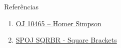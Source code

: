 \begin{frame}[fragile]{Referências}

    \begin{enumerate}
        \item \href{http://uva.onlinejudge.org/index.php?option=com_onlinejudge&Itemid=8&category=24&page=show_problem&problem=1406}{OJ 10465 -- Homer Simpson}
 
        \item \href{https://www.spoj.com/problems/SQRBR/}{SPOJ SQRBR - Square Brackets} 

    \end{enumerate}

\end{frame}
